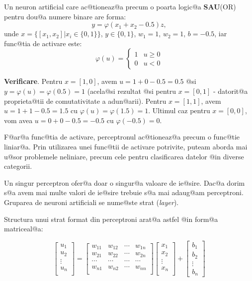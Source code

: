 \begin{exemplu}

	Un neuron artificial care ac@tioneaz@a precum o poarta logic@a {\bf SAU}(OR) pentru dou@a numere binare are forma:
$$
	y = \varphi ( x_1 + x_2 - 0.5 )z,
$$
\noindent unde $x = \{ [x_1, x_2] | x_i \in \{0, 1\} \}$, $y \in \{0, 1\}$, $w_1 = 1$, $w_2 = 1$, $b = -0.5$, iar func@tia de activare este: 
$$
	\varphi ( u ) = \left\lbrace
		\begin{array}{lc}
			1 & u \geq 0 \\
			0 & u < 0
		\end{array}
	\right.
$$
\end{exemplu}

{\bf Verificare}. Pentru $x = [1, 0]$, avem $u = 1 + 0 - 0.5 = 0.5$ @si $y = \varphi(u) = \varphi(0.5) = 1$ (acela@si rezultat @si pentru $x = [0, 1]$ - datorit@a proprieta@tii de comutativitate a adun@arii).
Pentru $x = [1, 1]$, avem $u = 1 + 1 - 0.5 = 1.5$ cu $\varphi (u) = \varphi ( 1.5 ) = 1$. Ultimul caz pentru $x = [0, 0]$, vom avea $u = 0 + 0 - 0.5 = -0.5$ cu $\varphi (-0.5) = 0$.

\begin{observatia}
	F@ar@a func@tia de activare, perceptronul ac@tioneaz@a precum o func@tie liniar@a. Prin utilizarea unei func@tii de activare potrivite, puteam aborda mai u@sor problemele neliniare, precum cele pentru clasificarea datelor @in diverse categorii.
\end{observatia}

Un singur perceptron ofer@a doar o singur@a valoare de ie@sire. Dac@a dorim s@a avem mai multe valori de ie@sire trebuie s@a mai adaug@am perceptroni. Gruparea de neuroni artificiali se nume@ste strat ({\sl layer}).

Structura unui strat format din perceptroni arat@a astfel @in form@a matriceal@a:

$$
	\begin{bmatrix}
		u_1 \\
		u_2 \\
		\vdots \\ 
		u_n \\
	\end{bmatrix}	
	= 
	\begin{bmatrix}
		w_{11} & w_{12} & \cdots & w_{1n} \\
		w_{21} & w_{22} & \cdots & w_{2n} \\
		\cdots & \cdots & \cdots & \cdots \\
		w_{n1} & w_{n2} & \cdots & w_{nn} \\
	\end{bmatrix}
	\begin{bmatrix}
		x_1 \\
		x_2 \\
		\vdots \\
		x_n \\
	\end{bmatrix}
	+
	\begin{bmatrix}
		b_1 \\
		b_2 \\
		\vdots \\
		b_n
	\end{bmatrix}
$$

